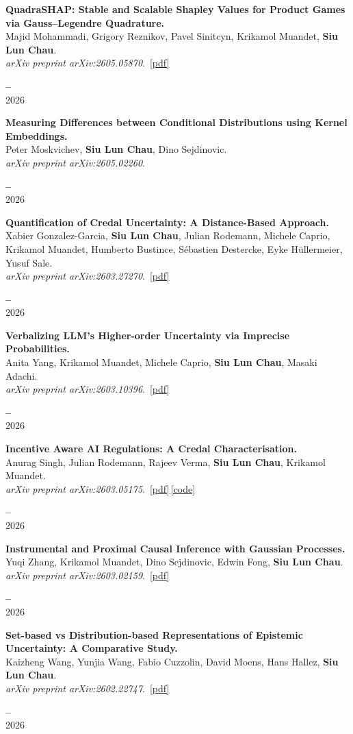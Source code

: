 \documentclass[11pt,a4paper]{article}
\newcommand{\me}{\textbf{Siu Lun Chau}}
\newcommand{\venueplain}[1]{\textit{#1}}
\newcommand{\pdfb}[1]{\,\href{#1}{\textcolor{accent}{\small[pdf]}}}
\newcommand{\codeb}[1]{\,\href{#1}{\textcolor{accent}{\small[code]}}}
\newlength{\citecolwidth}\setlength{\citecolwidth}{2.4cm}
\newlength{\indexcolwidth}\setlength{\indexcolwidth}{3.2em}
\newcommand{\citebox}[2]{%
  {\color{citecol}\textbf{\large #1}}\\[1pt]
  {\color{mutedgrey}\small #2}%
}
\newcommand{\pubentry}[4]{%
  \noindent
  \makebox[\indexcolwidth][l]{\textbf{[#1]}}%
  \begin{minipage}[t]{\dimexpr\linewidth-\indexcolwidth-\citecolwidth-0.4em\relax}#2\end{minipage}%
  \hspace{0.4em}%
  \begin{minipage}[t]{\citecolwidth}\raggedleft\citebox{#3}{#4}\end{minipage}%
  \par\vspace{6pt}}
\begin{document}
\pubentry{P2}{%
\textbf{QuadraSHAP: Stable and Scalable Shapley Values for Product Games via Gauss--Legendre Quadrature.}\\
Majid Mohammadi, Grigory Reznikov, Pavel Sinitcyn, Krikamol Muandet, \me.\\
\venueplain{arXiv preprint arXiv:2605.05870}.%
\pdfb{https://arxiv.org/pdf/2605.05870}%
}{--}{2026}

\pubentry{P3}{%
\textbf{Measuring Differences between Conditional Distributions using Kernel Embeddings.}\\
Peter Moskvichev, \me, Dino Sejdinovic.\\
\venueplain{arXiv preprint arXiv:2605.02260}.%
}{--}{2026}

\pubentry{P4}{%
\textbf{Quantification of Credal Uncertainty: A Distance-Based Approach.}\\
Xabier Gonzalez-Garcia, \me, Julian Rodemann, Michele Caprio, Krikamol Muandet, Humberto Bustince, S\'ebastien Destercke, Eyke H\"ullermeier, Yusuf Sale.\\
\venueplain{arXiv preprint arXiv:2603.27270}.%
\pdfb{https://arxiv.org/abs/2603.27270}%
}{--}{2026}

\pubentry{P5}{%
\textbf{Verbalizing LLM's Higher-order Uncertainty via Imprecise Probabilities.}\\
Anita Yang, Krikamol Muandet, Michele Caprio, \me, Masaki Adachi.\\
\venueplain{arXiv preprint arXiv:2603.10396}.%
\pdfb{https://arxiv.org/pdf/2603.10396}%
}{--}{2026}

\pubentry{P6}{%
\textbf{Incentive Aware AI Regulations: A Credal Characterisation.}\\
Anurag Singh, Julian Rodemann, Rajeev Verma, \me, Krikamol Muandet.\\
\venueplain{arXiv preprint arXiv:2603.05175}.%
\pdfb{https://arxiv.org/pdf/2603.05175}\codeb{https://github.com/muandet-lab/incentive-aware-ai-regulation}%
}{--}{2026}

\pubentry{P7}{%
\textbf{Instrumental and Proximal Causal Inference with Gaussian Processes.}\\
Yuqi Zhang, Krikamol Muandet, Dino Sejdinovic, Edwin Fong, \me.\\
\venueplain{arXiv preprint arXiv:2603.02159}.%
\pdfb{https://arxiv.org/pdf/2603.02159}%
}{--}{2026}

\pubentry{P8}{%
\textbf{Set-based vs Distribution-based Representations of Epistemic Uncertainty: A Comparative Study.}\\
Kaizheng Wang, Yunjia Wang, Fabio Cuzzolin, David Moens, Hans Hallez, \me.\\
\venueplain{arXiv preprint arXiv:2602.22747}.%
\pdfb{https://arxiv.org/pdf/2602.22747}%
}{--}{2026}
\end{document}
